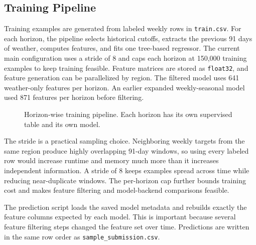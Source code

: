 \documentclass[conference]{IEEEtran}
\begin{document}
\subsection{Training Pipeline}
\label{sec:training_pipeline}

Training examples are generated from labeled weekly rows in \texttt{train.csv}.
For each horizon, the pipeline selects historical cutoffs, extracts the previous
91 days of weather, computes features, and fits one tree-based regressor. The
current main configuration uses a stride of 8 and caps each horizon at 150,000
training examples to keep training feasible. Feature matrices are stored as
\texttt{float32}, and feature generation can be parallelized by region. The
filtered model uses 641 weather-only features per horizon. An earlier expanded
weekly-seasonal model used 871 features per horizon before filtering.

\begin{figure}[t]
\centering
{}
\caption{Horizon-wise training pipeline. Each horizon has its own supervised
table and its own model.}
\label{fig:training_pipeline}
\end{figure}

The stride is a practical sampling choice. Neighboring weekly targets from the
same region produce highly overlapping 91-day windows, so using every labeled row
would increase runtime and memory much more than it increases independent
information. A stride of 8 keeps examples spread across time while reducing
near-duplicate windows. The per-horizon cap further bounds training cost and
makes feature filtering and model-backend comparisons feasible.

The prediction script loads the saved model metadata and rebuilds exactly the
feature columns expected by each model. This is important because several
feature filtering steps changed the feature set over time. Predictions are
written in the same row order as \texttt{sample\_submission.csv}.
\end{document}
